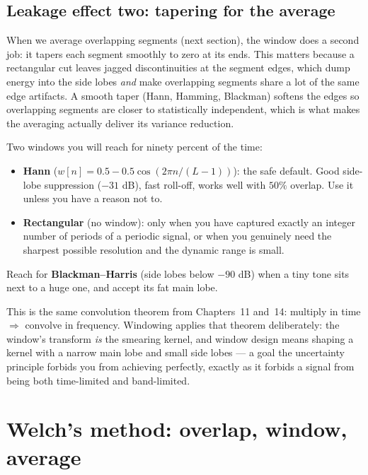 \subsection{Leakage effect two: tapering for the average}

When we average overlapping segments (next section), the window does a second job:
it tapers each segment smoothly to zero at its ends. This matters because a
rectangular cut leaves jagged discontinuities at the segment edges, which dump
energy into the side lobes \emph{and} make overlapping segments share a lot of the
same edge artifacts. A smooth taper (Hann, Hamming, Blackman) softens the edges so
overlapping segments are closer to statistically independent, which is what makes
the averaging actually deliver its variance reduction.

\begin{focusbox}
Two windows you will reach for ninety percent of the time:
\begin{itemize}
\item \textbf{Hann} ($w[n]=0.5-0.5\cos(2\pi n/(L-1))$): the safe default. Good
side-lobe suppression ($-31$ dB), fast roll-off, works well with $50\%$
overlap. Use it unless you have a reason not to.
\item \textbf{Rectangular} (no window): only when you have captured exactly an
integer number of periods of a periodic signal, or when you genuinely need the
sharpest possible resolution and the dynamic range is small.
\end{itemize}
Reach for \textbf{Blackman--Harris} (side lobes below $-90$ dB) when a tiny tone
sits next to a huge one, and accept its fat main lobe.
\end{focusbox}

\begin{connectionbox}
This is the same convolution theorem from Chapters~11 and~14:
multiply in time $\Rightarrow$ convolve in frequency. Windowing applies that
theorem deliberately: the window's transform \emph{is} the smearing kernel, and
window design means shaping a kernel with a narrow
main lobe and small side lobes --- a goal the uncertainty principle forbids you
from achieving perfectly, exactly as it forbids a signal from being both
time-limited and band-limited.
\end{connectionbox}

\section{Welch's method: overlap, window, average}
\label{ch21:welch}

